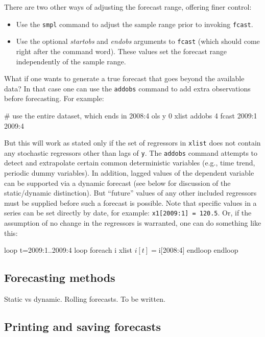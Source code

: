 There are two other ways of adjusting the forecast range, offering
finer control:
%
\begin{itemize}
\item Use the \texttt{smpl} command to adjust the sample range
  prior to invoking \texttt{fcast}.
\item Use the optional \textsl{startobs} and \textsl{endobs} arguments
  to \texttt{fcast} (which should come right after the command word).
  These values set the forecast range independently of the
  sample range.
\end{itemize}

What if one wants to generate a true forecast that goes beyond the
available data?  In that case one can use the \texttt{addobs} command
to add extra observations before forecasting.  For example:
%
\begin{code}
# use the entire dataset, which ends in 2008:4
ols y 0 xlist
addobs 4
fcast 2009:1 2009:4
\end{code}
%
But this will work as stated only if the set of regressors in
\texttt{xlist} does not contain any stochastic regressors other than
lags of \texttt{y}.  The \texttt{addobs} command attempts to detect
and extrapolate certain common deterministic variables (e.g., time
trend, periodic dummy variables).  In addition, lagged values of the
dependent variable can be supported via a dynamic forecast (see below
for discussion of the static/dynamic distinction).  But ``future''
values of any other included regressors must be supplied before such a
forecast is possible.  Note that specific values in a series can be
set directly by date, for example: \texttt{x1[2009:1] = 120.5}.  Or,
if the assumption of no change in the regressors is warranted, one can
do something like this:
%
\begin{code}
loop t=2009:1..2009:4
    loop foreach i xlist
        $i[t] = $i[2008:4]
    endloop
endloop
\end{code}



\subsection{Forecasting methods}

Static vs dynamic.  Rolling forecasts.  To be written.


\subsection{Printing and saving forecasts}

